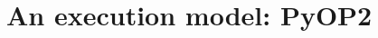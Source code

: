 \documentclass[thesis]{subfiles}
\begin{document}
%
%
%
%
%



\section{An execution model: PyOP2}


\end{document}
